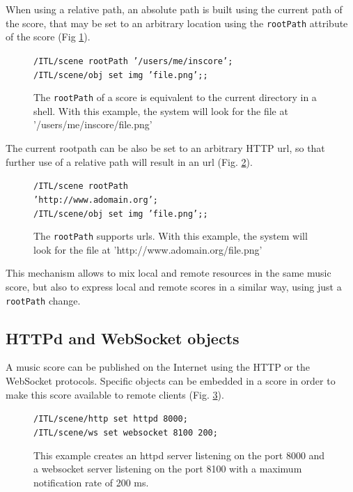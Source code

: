 \documentclass[11pt,a4paper]{article}
\newcommand{\OSC}[1]	{{\fontsize{10pt}{10pt} \selectfont\texttt{#1}}}
\newcommand{\tab}		{\hspace*{4mm}}
\newcommand{\dtab}		{\tab \tab}
\newcommand{\sample}[1]	{\vspace{-0.2em}\begin{center}\colorbox{mygrey}{\begin{minipage}[t]{0.98\columnwidth} {\small \texttt{#1}}\end{minipage}}\end{center}}
\begin{document}
When using a relative path, an absolute path is built using the current path of the score, that may be set to an arbitrary location using the \OSC{rootPath} attribute of the score (Fig \ref{fig:rootpath}). 

\begin{figure}[ht]
\begin{center}
\sample{/ITL/scene rootPath '/users/me/inscore';\\
/ITL/scene/obj set img 'file.png';;
}
\caption{The \OSC{rootPath} of a score is equivalent to the current directory in a shell. With this example, the system will look for the file at '/users/me/inscore/file.png'}
\label{fig:rootpath}
\end{center}
\end{figure}

The current rootpath can be also be set to an arbitrary HTTP url, so that further use of a relative path will result in an url (Fig. \ref{fig:rooturl}).

\begin{figure}[ht]
\begin{center}
\sample{/ITL/scene rootPath \\
\dtab \dtab \dtab 'http://www.adomain.org';\\
/ITL/scene/obj set img 'file.png';;
}
\caption{The \OSC{rootPath} supports urls. With this example, the system will look for the file at 'http://www.adomain.org/file.png'}
\label{fig:rooturl}
\end{center}
\end{figure}

This mechanism allows to mix local and remote resources in the same music score, but also to express local and remote scores in a similar way, using just a \OSC{rootPath} change.


\subsection{HTTPd and WebSocket objects}

A music score can be published on the Internet using the HTTP or the WebSocket protocols. Specific objects can be embedded in a score in order to make this score available to remote clients (Fig. \ref{fig:servers}).

\begin{figure}[ht]
\begin{center}
\sample{/ITL/scene/http set httpd 8000; \\
  /ITL/scene/ws set websocket 8100 200;
}
\caption{This example creates an httpd server listening on the port 8000 and a websocket server listening on the port 8100 with a  maximum notification rate of 200 ms.}
\label{fig:servers}
\end{center}
\end{figure}
\end{document}
